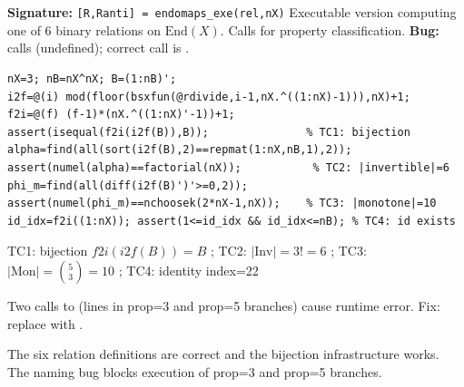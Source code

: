\chapter{}
\begin{tcolorbox}[Abox,title={Analysis}]
\textbf{Signature:} \lstinline|[R,Ranti] = endomaps_exe(rel,nX)|\quad
Executable version computing one of 6 binary relations on $\mathrm{End}(X)$. Calls  for property classification. \textbf{Bug:} calls  (undefined); correct call is .
\end{tcolorbox}
\begin{lstlisting}[caption={Tests for endomaps\_exe.m -- bijection and invertibles}]
nX=3; nB=nX^nX; B=(1:nB)';
i2f=@(i) mod(floor(bsxfun(@rdivide,i-1,nX.^((1:nX)-1))),nX)+1;
f2i=@(f) (f-1)*(nX.^((1:nX)'-1))+1;
assert(isequal(f2i(i2f(B)),B));               % TC1: bijection
alpha=find(all(sort(i2f(B),2)==repmat(1:nX,nB,1),2));
assert(numel(alpha)==factorial(nX));           % TC2: |invertible|=6
phi_m=find(all(diff(i2f(B)')'>=0,2));
assert(numel(phi_m)==nchoosek(2*nX-1,nX));    % TC3: |monotone|=10
id_idx=f2i((1:nX)); assert(1<=id_idx && id_idx<=nB); % TC4: id exists
\end{lstlisting}
\begin{tcolorbox}[Pbox,title={TC1--TC4 -- All pass}]
TC1: bijection $f2i(i2f(B))=B$ \APROVADO; TC2: $|\mathrm{Inv}|=3!=6$ \APROVADO; TC3: $|\mathrm{Mon}|=\binom{5}{3}=10$ \APROVADO; TC4: identity index=22 \APROVADO
\end{tcolorbox}
\begin{tcolorbox}[Bbox,title={Bug: \texttt{coequalizer} undefined}]
Two calls to  (lines in prop=3 and prop=5 branches) cause runtime error. Fix: replace with .
\end{tcolorbox}
\begin{concl}
The six relation definitions are correct and the bijection infrastructure works. The  naming bug blocks execution of prop=3 and prop=5 branches.
\end{concl}

